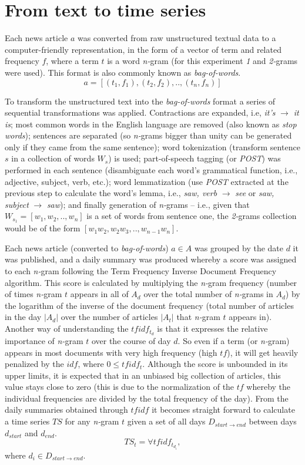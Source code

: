 \documentclass{article}
\begin{document}
\section{From text to time series}
Each news article \(a\) was converted from raw unstructured textual data to a computer-friendly representation, in the form of a vector of term and related frequency \(f\), where a term \(t\) is a word \textit{n-}gram (for this experiment \textit{1} and \textit{2-}grams were used). This format is also commonly known as \textit{bag-of-words}.
\[a=[(t_1,f_1),(t_2,f_2),..,(t_n,f_n)]\]
\par
To transform the unstructured text into the \textit{bag-of-words} format a series of sequential transformations was applied. Contractions are expanded, i.e, \textit{it's} \(\to\) \textit{it is}; most common words in the English language are removed (also known as \textit{stop words}); sentences are separated (so \textit{n-}grams bigger than unity can be generated only if they came from the same sentence); word tokenization (transform sentence \(s\) in a collection of words \(W_s\)) is used; part-of-speech tagging (or \textit{POST}) was performed in each sentence (disambiguate each word's grammatical function, i.e., adjective, subject, verb, etc.); word lemmatization (use \textit{POST} extracted at the previous step to calculate the word's lemma, i.e., \textit{saw, verb} \(\to\) \textit{see} or \textit{saw, subject} \(\to\) \textit{saw}); and finally generation of \textit{n-}grams -- i.e., given that \(W_{s_1}=[w_1,w_2,..,w_n]\) is a set of words from sentence one, the \textit{2-}grams collection would be of the form \([w_1 w_2,w_2 w_3,..,w_{n-1} w_n]\).
\par
Each news article (converted to \textit{bag-of-words}) \(a \in A\) was grouped by the date \(d\) it was published, and a daily summary was produced whereby a score was assigned to each \textit{n-}gram following the Term Frequency Inverse Document Frequency algorithm. This score is calculated by multiplying the \textit{n-}gram frequency (number of times \textit{n-}gram \(t\) appears in all of \(A_d\) over the total number of \textit{n-}grams in \(A_d\)) by the logarithm of the inverse of the document frequency (total number of articles in the day \(\vert A_d \vert\) over the number of articles \(\vert A_t \vert\) that \textit{n-}gram \(t\) appears in). Another way of understanding the \(tfidf_{t_d}\) is that it expresses the relative importance of \textit{n-}gram \(t\) over the course of day \(d\). So even if a term (or \textit{n-}gram) appears in most documents with very high frequency (high \(tf\)), it will get heavily penalized by the \(idf\), where \(0 \leq tfidf_t\). Although the score is unbounded in its upper limits, it is expected that in an unbiased big collection of articles, this value stays close to zero (this is due to the normalization of the \(tf\) whereby the individual frequencies are divided by the total frequency of the day).
From the daily summaries obtained through \(tfidf\) it becomes straight forward to calculate a time series \(TS\) for any \textit{n-}gram \(t\) given a set of all days \(D_{start \to end}\) between days \(d_{start}\) and \(d_{end}\).
\[TS_t=\forall{tfidf_{t_{d_i}}},\] where \(d_i \in D_{start \to end}\).
\end{document}
